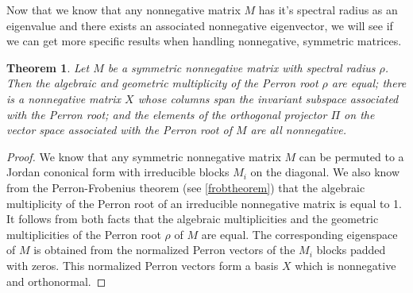 \documentclass[a4paper,11pt]{report}
\newtheorem{theorem}{Theorem}[section]
\begin{document}
Now that we know that any nonnegative matrix $M$ has it's spectral radius as an 
eigenvalue and there exists an associated nonnegative eigenvector, we will see 
if we can get more specific results when handling nonnegative, symmetric 
matrices.
\begin{theorem}
  Let $M$ be a symmetric nonnegative matrix with spectral radius $\rho$. Then 
  the algebraic and geometric multiplicity of the Perron root $\rho$ are equal; 
  there is a nonnegative matrix $X$ whose columns span the invariant subspace 
  associated with the Perron root; and the elements of the orthogonal projector 
  $\Pi$ on the vector space associated with the Perron root of $M$ are all 
  nonnegative.
\end{theorem}
\begin{proof}
  We know that any symmetric nonnegative matrix $M$ can be permuted to a Jordan cononical form
  with irreducible blocks $M_i$ on the diagonal. We also know from the 
  Perron-Frobenius theorem (see \ref{frobtheorem}) that the algebraic 
  multiplicity of the Perron root of an irreducible nonnegative matrix is equal 
  to 1. It follows from both facts that the algebraic multiplicities and the geometric
  multiplicities  of the Perron root $\rho$ of $M$ are equal. The corresponding 
  eigenspace of $M$ is obtained from the normalized Perron vectors of the $M_i$ 
  blocks padded with zeros. This normalized Perron vectors form a basis $X$ which is nonnegative and 
  orthonormal.
  \end{proof}
  
\end{document}
